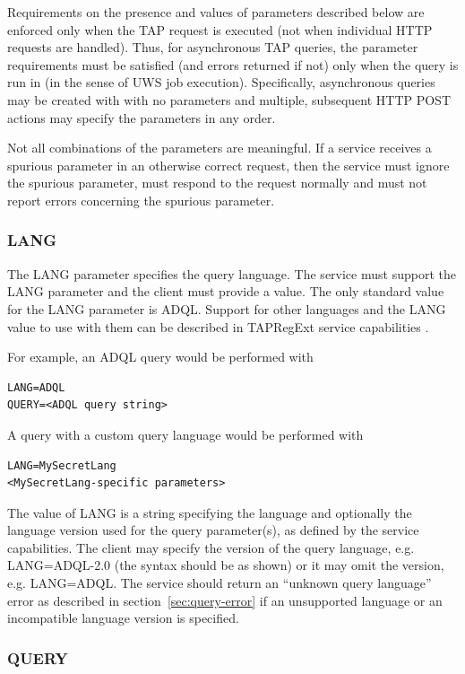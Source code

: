 \documentclass[11pt,letter]{ivoa}
\begin{document}
Requirements on the presence and values of parameters described below are 
enforced only when the TAP request is executed (not when individual HTTP 
requests are handled). Thus, for asynchronous TAP queries, the parameter 
requirements must be satisfied (and errors returned if not) only when the query 
is run in (in the sense of UWS job execution). Specifically, asynchronous 
queries may be created with with no parameters and multiple, subsequent HTTP 
POST actions may specify the parameters in any order.

Not all combinations of the parameters are meaningful. If a 
service receives a spurious parameter in an otherwise correct request, then the 
service must ignore the spurious parameter, must respond to the request normally 
and must not report errors concerning the spurious parameter.

\subsubsection{LANG}
\label{sec:LANG}

The LANG parameter specifies the query language. The service must support the LANG 
parameter and the client must provide a value. The only standard 
value for the LANG parameter is ADQL. Support for other 
languages and the LANG value to use with them can be described in
TAPRegExt service 
capabilities \citep{2012ivoa.spec.0827D}.

For example, an ADQL query would be performed with
\begin{verbatim}
LANG=ADQL
QUERY=<ADQL query string>
\end{verbatim}
A query with a custom query language would be performed with
\begin{verbatim}
LANG=MySecretLang
<MySecretLang-specific parameters>
\end{verbatim}
The value of LANG is a string specifying the language and optionally the 
language version used for the query parameter(s), as defined by the service 
capabilities.  The client may specify the version of the query language,  e.g. 
LANG=ADQL-2.0 (the syntax should be as shown) or it may omit the version, e.g. 
LANG=ADQL.  The service should return an “unknown query language” error as 
described in section~\ref{sec:query-error} if an unsupported language or an incompatible 
language version is specified.

\subsubsection{QUERY}
\label{sec:QUERY}
\end{document}
